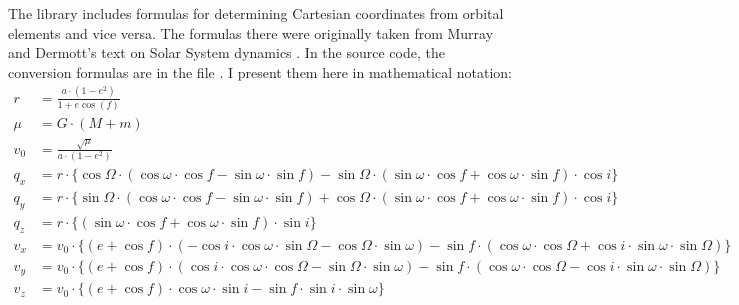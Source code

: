 The  library includes formulas for determining Cartesian coordinates from orbital elements and vice versa.
The formulas there were originally taken from Murray and Dermott's text on Solar System dynamics \cite{SSD}.
In the  source code, the conversion formulas are in the file .
I present them here in mathematical notation:
\begin{align*}
r &= \frac{a \cdot (1 - e^2) }{1 + e \cos (f) } \\
\mu &= G \cdot (M + m) \\
v_0 &= \frac{\sqrt{ \mu}}{{a \cdot (1 - e^2)}} \\
q_x &= r \cdot \lbrace 
\cos \Omega \cdot (\cos \omega \cdot \cos f - \sin \omega \cdot \sin f) - 
\sin \Omega \cdot (\sin \omega \cdot \cos f +\cos \omega \cdot \sin f ) 
\cdot \cos i \rbrace \\
q_y &= r \cdot \lbrace 
\sin \Omega \cdot (\cos \omega \cdot \cos f - \sin \omega \cdot \sin f) + 
\cos \Omega \cdot (\sin \omega \cdot \cos f +\cos \omega \cdot \sin f )
 \cdot \cos i \rbrace \\
q_z &= r \cdot \lbrace (\sin \omega \cdot \cos f + \cos \omega \cdot \sin f) \cdot \sin i \rbrace \\
v_x &= v_0 \cdot \lbrace 
(e + \cos f) 
\cdot (-\cos i \cdot \cos \omega \cdot \sin \Omega - \cos \Omega \cdot \sin \omega) - 
\sin f \cdot  (\cos \omega \cdot \cos \Omega + \cos i \cdot \sin \omega \cdot \sin \Omega) 
\rbrace \\
v_y &= v_0 \cdot \lbrace 
(e + \cos f) 
\cdot (\cos i \cdot \cos \omega \cdot \cos \Omega - \sin \Omega \cdot \sin \omega) - 
\sin f \cdot  (\cos \omega \cdot \cos \Omega - \cos i \cdot \sin \omega \cdot \sin \Omega) 
\rbrace \\
v_z &= v_0 \cdot \lbrace 
(e + \cos f) \cdot \cos \omega \cdot \sin i - \sin f \cdot \sin i \cdot \sin \omega
\rbrace
\end{align*}

